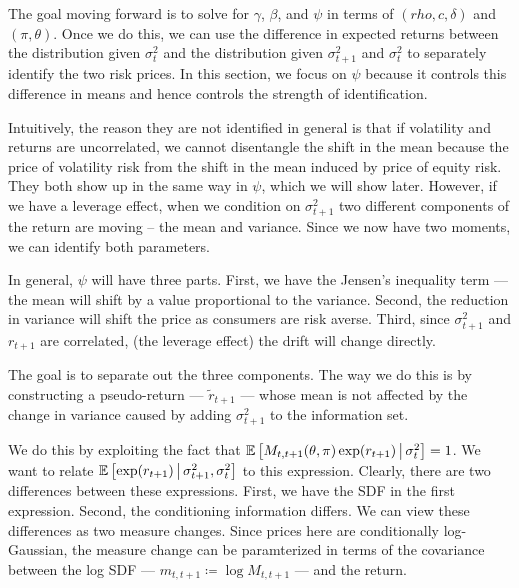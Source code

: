 \documentclass[11pt, letterpaper, twoside, final]{article}
\begin{document}
The goal moving forward is to solve for $\gamma$, $\beta$, and $\psi$ in terms of $(rho, c, \delta)$ and $(\pi, \theta)$. Once we do this, we can use the difference in expected returns between the distribution given $\sigma^2_t$ and the distribution given $\sigma^2_{t+1}$ and $\sigma^2_t$ to separately identify the two risk prices. In this section, we focus on $\psi$ because it controls this difference in means and hence controls the strength of identification.

Intuitively, the reason they are not identified in general is that if volatility and returns are uncorrelated, we cannot disentangle the shift in the mean because the price of volatility risk from the shift in the mean induced by price of equity risk. They both show up in the same way in $\psi$, which we will show later. However, if we have a leverage effect, when we condition on $\sigma^2_{t+1}$ two different components of the return are moving -- the mean and variance. Since we now have two moments, we can identify both parameters.

In general, $\psi$ will have three parts. First, we have the Jensen's inequality term --- the mean will shift by a value proportional to the variance. Second, the reduction in variance will shift the price as consumers are risk averse. Third, since $\sigma^2_{t+1}$ and $r_{t+1}$ are correlated, (the leverage effect) the drift will change directly. 

The goal is to separate out the three components. The way we do this is by constructing a pseudo-return --- $\widetilde{r}_{t+1}$ --- whose mean is not affected by the change in variance caused by adding $\sigma^2_{t+1}$ to the information set.

We do this by exploiting the fact that $\operatorname{\mathbb{E}}\left[M_{t,t+1}(\theta, \pi) \exp(r_{t+1}) \,\middle\vert\, \sigma^2_t \right] = 1$. We want to relate $\operatorname{\mathbb{E}}\left[\exp(r_{t+1}) \,\middle\vert\, \sigma^2_{t+1}, \sigma^2_t \right]$ to this expression. Clearly, there are two differences between these expressions. First, we have the SDF in the first expression. Second, the conditioning information differs. We can view these differences as two measure changes. Since prices here are conditionally log-Gaussian, the measure change can be paramterized in terms of the covariance between the log SDF --- $m_{t,t+1} \coloneqq \log M_{t,t+1}$ --- and the return.
\end{document}

